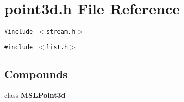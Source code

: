 \section{point3d.h File Reference}
\label{point3d_h}
{\tt \#include $<$stream.h$>$}\par
{\tt \#include $<$list.h$>$}\par
\subsection*{Compounds}
\begin{CompactItemize}
\item 
class {\bf MSLPoint3d}
\end{CompactItemize}
